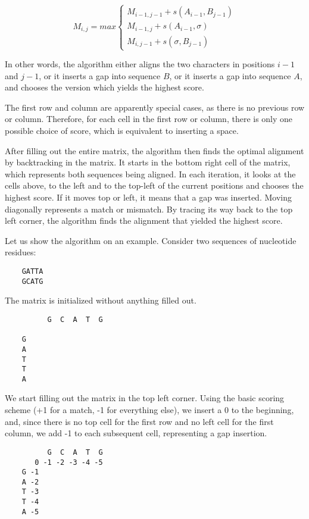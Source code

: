 \[ M_{i, j} = max
    \begin{cases}
        M_{i-1, j-1} + s(A_{i-1}, B_{j-1}) \\
        M_{i-1, j} + s(A_{i-1}, \sigma)    \\
        M_{i, j-1} + s(\sigma, B_{j-1})
    \end{cases}
\]

In other words, the algorithm either aligns the two characters in positions $i-1$ and $j-1$, or it inserts a gap into sequence $B$, or it inserts a gap into sequence $A$,
and chooses the version which yields the highest score.

The first row and column are apparently special cases, as there is no previous row or column. Therefore, for each cell in the first row or column, there is
only one possible choice of score, which is equivalent to inserting a space.

After filling out the entire matrix, the algorithm then finds the optimal alignment by backtracking in the matrix. It starts in the bottom right
cell of the matrix, which represents both sequences being aligned. In each iteration, it looks at the cells above, to the left and to the top-left
of the current positions and chooses the highest score. If it moves top or left, it means that a gap was inserted. Moving diagonally represents a match
or mismatch. By tracing its way back to the top left corner, the algorithm finds the alignment that yielded the highest score.

Let us show the algorithm on an example. Consider two sequences of nucleotide residues:

\begin{verbatim}
    GATTA
    GCATG
\end{verbatim}

The matrix is initialized without anything filled out.

\begin{verbatim}
          G  C  A  T  G
      
    G 
    A 
    T 
    T 
    A 
\end{verbatim}

We start filling out the matrix in the top left corner. Using the basic scoring scheme (+1 for a match, -1 for everything else), we insert a 0
to the beginning, and, since there is no top cell for the first row and no left cell for the first column, we add -1 to each subsequent cell,
representing a gap insertion.

\begin{verbatim}
          G  C  A  T  G
       0 -1 -2 -3 -4 -5
    G -1
    A -2
    T -3
    T -4
    A -5
\end{verbatim}

